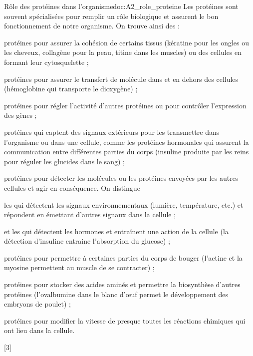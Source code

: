\begin{doc}{Rôle des protéines dans l'organisme}{doc:A2_role_proteine}
  Les protéines sont souvent spécialisées pour remplir un rôle biologique et assurent le bon fonctionnement de notre organisme.
  On trouve ainsi des :
  \begin{listePoints}
    \item protéines  pour assurer la cohésion de certains tissus (kératine pour les ongles ou les cheveux, collagène pour la peau, titine dans les muscles) ou des cellules en formant leur cytosquelette ;
    \item protéines  pour assurer le transfert de molécule dans et en dehors des cellules (hémoglobine qui transporte le dioxygène) ;
    \item protéines  pour régler l'activité d'autres protéines ou pour contrôler l'expression des gènes ;
    \item protéines  qui captent des signaux extérieurs pour les transmettre dans l'organisme ou dans une cellule, comme les protéines hormonales qui assurent la communication entre différentes parties du corps (insuline produite par les reins pour réguler les glucides dans le sang) ;
    \item protéines  pour détecter les molécules ou les protéines envoyées par les autres cellules et agir en conséquence. On distingue
    \begin{listePoints}
      \item les  qui détectent les signaux environnementaux (lumière, température, etc.) et répondent en émettant d'autres signaux dans la cellule ;
      \item et les  qui détectent les hormones et entraînent une action de la cellule (la détection d'insuline entraine l'absorption du glucose) ;
    \end{listePoints}
    \item protéines  pour permettre à certaines parties du corps de bouger (l'actine et la myosine permettent au muscle de se contracter) ;
    \item protéines  pour stocker des acides aminés et permettre la biosynthèse d'autres protéines (l'ovalbumine dans le blanc d’œuf permet le développement des embryons de poulet) ;
    \item protéines  pour modifier la vitesse de presque toutes les réactions chimiques qui ont lieu dans la cellule.  
  \end{listePoints}
\end{doc}

[3]

